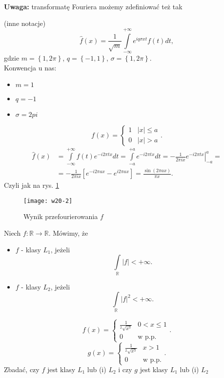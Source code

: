 \documentclass[../main.tex]{subfiles}
\begin{document}
 \pagebreak
 \textbf{Uwaga: }transformatę Fouriera możemy zdefiniować też tak
 \begin{definicja}
     (inne notacje)
     \[
         \hat{f}(x) = \frac{1}{\sqrt{m} }\int\limits_{-\infty}^{+\infty}e^{iq\sigma xt}f(t)dt
     ,\]
 gdzie $m = \left\{ 1,2\pi \right\} $, $q = \left\{ -1, 1 \right\} $, $\sigma = \left\{ 1,2\pi \right\} $.\\
     Konwencja u nas:
     \begin{itemize}
         \item $m = 1 $
         \item $q = - 1$
         \item $\sigma = 2pi$
     \end{itemize}
 \end{definicja}
 \begin{przyklad}
     \[
         f(x) = \begin{cases}
             1&|x|\le a\\ 0 & |x| > a
         \end{cases}
     .\]
 \begin{align*}
     \hat{f}(x) &= \int\limits_{-\infty}^{+\infty}f(t)e^{-i 2\pi t x}dt = \int\limits_{-a}^{+a}e^{-i 2\pi tx}dt = \left.-\frac{1}{2\pi i x}e^{-i 2 \pi t x}\right|_{-a}^{a} =\\
     &= -\frac{1}{2\pi i x}\left[ e^{-i 2 \pi a x} - e^{i 2 \pi a x} \right] = \frac{\sin(2\pi a x)}{\pi x}
 .\end{align*}
 Czyli jak na rys. \ref{fig:w20-2}
 \end{przyklad}
 \begin{figure}[h]
     \centering
     \texttt{[image: w20-2]}
     \caption{Wynik przefourierowania $f$}
     \label{fig:w20-2}
 \end{figure}
 \begin{definicja}
     Niech $f: \mathbb{R}\to \mathbb{R}$. Mówimy, że
     \begin{itemize}
         \item $f$ - klasy $L_1$, jeżeli
              \[
             \int\limits_{\mathbb{R}}|f| < +\infty
             .\]
     \item $f$ - klasy $L_2$, jeżeli
         \[
         \int\limits_{\mathbb{R}}|f|^2 < +\infty
         .\]
     \end{itemize}
 \end{definicja}
 \begin{przyklad}
     \[
         f(x) = \begin{cases}
             \frac{1}{^2\sqrt{x^3}} & 0 < x \le 1\\
             0 & \text{w p.p.}
         \end{cases}
     .\]
 \[
     g(x) = \begin{cases}
         \frac{1}{^2\sqrt{x^3} }& x > 1\\
         0 & \text{w p.p.}
     \end{cases}
 .\]
 Zbadać, czy $f$ jest klasy $L_1$ lub (i) $L_2$ i czy $g$ jest klasy $L_1$ lub (i) $L_2$
 \end{przyklad}
\end{document}
